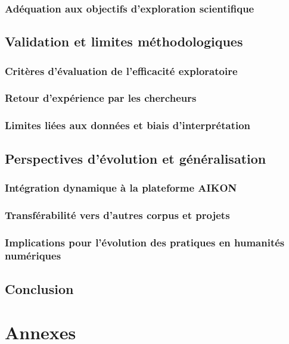 \documentclass[a4paper,12pt,twoside]{book}
\newcommand{\clearemptydoublepage}{\newpage{\pagestyle{empty}\cleardoublepage}}
\newcommand\chapterNo[1]{
	\chapter*{#1}
	\markright{\MakeUppercase{#1}}
}
\begin{document}
	\section{Adéquation aux objectifs d'exploration scientifique}

	\clearemptydoublepage

	\chapter{Validation et limites méthodologiques}
	\section{Critères d'évaluation de l'efficacité exploratoire}

	\section{Retour d'expérience par les chercheurs}

	\section{Limites liées aux données et biais d'interprétation}

	\clearemptydoublepage

	\chapter{Perspectives d'évolution et généralisation}
	\section{Intégration dynamique à la plateforme AIKON}

	\section{Transférabilité vers d'autres corpus et projets}

	\section{Implications pour l'évolution des pratiques en humanités numériques}

	\clearemptydoublepage

	\chapterNo{Conclusion}

	\appendix
	\part*{Annexes}

	\clearemptydoublepage

	\backmatter
	\printacronyms[title=Liste des acronymes,toctitle=Acronymes]
	\printglossary
	\printbibliography
	\tableofcontents
\end{document}
